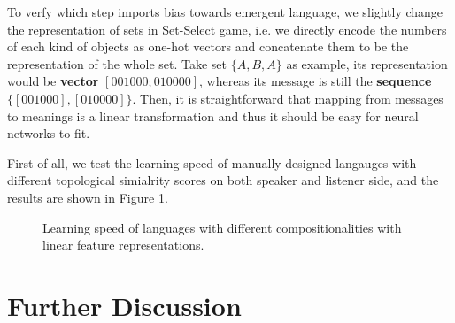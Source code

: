 To verfy which step imports bias towards emergent language, we slightly change the representation of sets in Set-Select game, i.e. we directly encode the numbers of each kind of objects as one-hot vectors and concatenate them to be the representation of the whole set. Take set $\{A, B, A\}$ as example, its representation would be \textbf{vector} $[0 0 1 0 0 0; 0 1 0 0 0 0]$, whereas its message is still the \textbf{sequence} $\{[0 0 1 0 0 0], [0 1 0 0 0 0]\}$. Then, it is straightforward that mapping from messages to meanings is a linear transformation and thus it should be easy for neural networks to fit.

First of all, we test the learning speed of manually designed langauges with different topological simialrity scores on both speaker and listener side, and the results are shown in Figure \ref{fig4.5:learning_speed_joshua}.

\begin{figure}[!h]
    \centering
    \caption{Learning speed of languages with different compositionalities with linear feature representations.}
    \label{fig4.5:learning_speed_joshua}
\end{figure}



\section{Further Discussion}
\label{sec4.5:discuss}